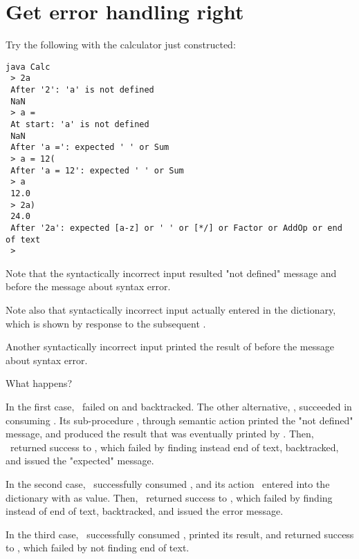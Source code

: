 
\section{Get error handling right\label{errors}}


Try the following with the calculator just constructed:

\small
\begin{Verbatim}[samepage=true,xleftmargin=15mm,baselinestretch=0.8]
 java Calc
 > 2a
 After '2': 'a' is not defined
 NaN
 > a =
 At start: 'a' is not defined
 NaN
 After 'a =': expected ' ' or Sum
 > a = 12(
 After 'a = 12': expected ' ' or Sum
 > a
 12.0
 > 2a)
 24.0
 After '2a': expected [a-z] or ' ' or [*/] or Factor or AddOp or end of text
 > 
\end{Verbatim}
\normalsize

Note that the syntactically incorrect input 
resulted "not defined" message and 
before the message about syntax error.

Note also that syntactically incorrect input 
actually entered  in the dictionary, which is shown 
by response to the subsequent .

Another syntactically incorrect input 
printed the result of 
before the message about syntax error.

What happens?

In the first case, \Store\ failed on  and backtracked.
The other alternative, \Print, succeeded in consuming .
Its sub-procedure \Factor, through semantic action 
printed the "not defined" message, and produced the result 
that was eventually printed by \Printa.
Then, \Print\ returned success to \Input, which failed
by finding  instead end of text, 
backtracked, and issued the "expected" message.

In the second case, \Store\ successfully consumed ,
and its action \Storea\ entered  into the dictionary with  as value.
Then, \Store\ returned success to \Input, which failed by finding  instead of end of text,
backtracked, and issued the error message.

In the third case, \Print\ successfully consumed , printed its result,
and returned success to \Input, which failed by not finding end of text.


